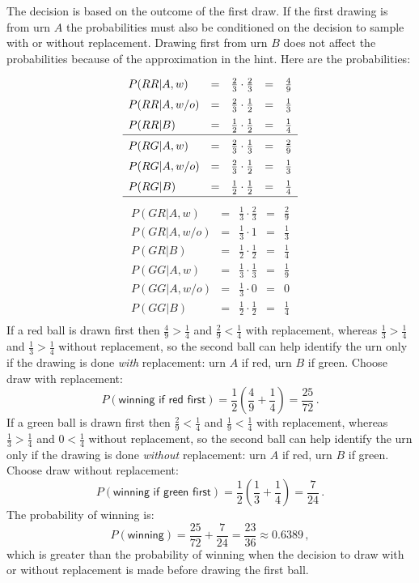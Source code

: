  The decision is based on the outcome of the first draw. If the first drawing is from urn $A$ the probabilities must also be conditioned on the decision to sample with or without replacement. Drawing first from urn $B$ does not affect the probabilities because of the approximation in the hint. Here are the probabilities:
\[
\renewcommand*{\arraystretch}{1.5}
\begin{array}{lcccc}
P(RR|A,w) &=& \frac{2}{3} \cdot \frac{2}{3} &=& \frac{4}{9}\\
P(RR|A,w/o) &=& \frac{2}{3} \cdot \frac{1}{2} &=& \frac{1}{3}\\
P(RR|B) &=& \frac{1}{2} \cdot \frac{1}{2} &=& \frac{1}{4}\\
\hline
P(RG|A,w) &=& \frac{2}{3} \cdot \frac{1}{3} &=& \frac{2}{9}\\
P(RG|A,w/o) &=& \frac{2}{3} \cdot \frac{1}{2} &=& \frac{1}{3}\\
P(RG|B) &=& \frac{1}{2} \cdot \frac{1}{2} &=& \frac{1}{4}\\
\hline
\end{array}
\]
\[
\renewcommand*{\arraystretch}{1.5}
\begin{array}{lcccc}
P(GR|A,w) &=& \frac{1}{3} \cdot \frac{2}{3} &=& \frac{2}{9}\\
P(GR|A,w/o) &=& \frac{1}{3} \cdot 1 &=& \frac{1}{3}\\
P(GR|B) &=& \frac{1}{2} \cdot \frac{1}{2} &=& \frac{1}{4}\\
\hline
P(GG|A,w) &=& \frac{1}{3} \cdot \frac{1}{3} &=& \frac{1}{9}\\
P(GG|A,w/o) &=& \frac{1}{3} \cdot 0 &=&0\\
P(GG|B) &=& \frac{1}{2} \cdot \frac{1}{2} &=& \frac{1}{4}\\\end{array}
\]
If a red ball is drawn first then $\frac{4}{9}>\frac{1}{4}$ and $\frac{2}{9}<\frac{1}{4}$ with replacement, whereas $\frac{1}{3}>\frac{1}{4}$ and $\frac{1}{3}>\frac{1}{4}$ without replacement, so the second ball can help identify the urn only if the drawing is done \emph{with} replacement: urn $A$ if red, urn $B$ if green. Choose draw with replacement:
\[
P(\textsf{winning if red first})=\frac{1}{2}\left(\frac{4}{9}+\frac{1}{4}\right)=\frac{25}{72}\,.
\]
If a green ball is drawn first then $\frac{2}{9}<\frac{1}{4}$ and $\frac{1}{9}<\frac{1}{4}$ with replacement, whereas $\frac{1}{3}>\frac{1}{4}$ and $0<\frac{1}{4}$ without replacement, so the second ball can help identify the urn only if the drawing is done \emph{without} replacement: urn $A$ if red, urn $B$ if green. Choose draw without replacement:
\[
P(\textsf{winning if green first})=\frac{1}{2}\left(\frac{1}{3}+\frac{1}{4}\right)=\frac{7}{24}\,.
\]
The probability of winning is:
\[
P(\textsf{winning})=\frac{25}{72} + \frac{7}{24}=\frac{23}{36}\approx 0.6389\,,
\]
which is greater than the probability of winning when the decision to draw with or without replacement is made before drawing the first ball.


